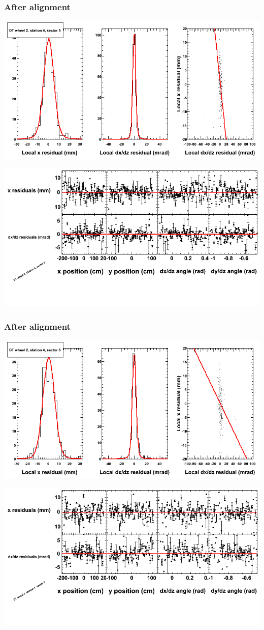 \documentclass[compress]{beamer}
\begin{document}
\begin{frame}
\frametitle{After alignment}
\includegraphics[width=0.7\linewidth]{NOV4_fitfunctions/MBwhEst4sec05_bellcurves.png}

\includegraphics[width=0.7\linewidth]{NOV4_fitfunctions/MBwhEst4sec05_polynomials.png}
\end{frame}

\begin{frame}
\frametitle{After alignment}
\includegraphics[width=0.7\linewidth]{NOV4_fitfunctions/MBwhEst4sec08_bellcurves.png}

\includegraphics[width=0.7\linewidth]{NOV4_fitfunctions/MBwhEst4sec08_polynomials.png}
\end{frame}
\end{document}
